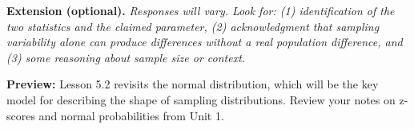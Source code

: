 \documentclass[10pt]{article}
\begin{document}
\begin{extensionbox}
\textbf{Extension (optional).} \textit{Responses will vary. Look for: (1) identification of the two statistics and the claimed parameter, (2) acknowledgment that sampling variability alone can produce differences without a real population difference, and (3) some reasoning about sample size or context.}
\end{extensionbox}

\begin{reflectionbox}
\textbf{Preview:} Lesson 5.2 revisits the normal distribution, which will be the key
model for describing the shape of sampling distributions. Review your notes on
z-scores and normal probabilities from Unit 1.
\end{reflectionbox}
\end{document}
